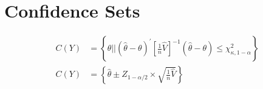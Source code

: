 \section{Confidence Sets}
\begin{align*}
    C(Y)&=\left\{\theta||(\widehat{\theta}-\theta)^{\prime}\left[\frac{1}{n} \widehat{V}\right]^{-1}(\widehat{\theta}-\theta) \leq \chi_{\kappa, 1-\alpha}^2\right\} \\
    C(Y)&=\left\{\widehat{\theta}\pm Z_{1-\alpha / 2} \times \sqrt{\frac{1}{n} \widehat{V}} \right\}
\end{align*}
